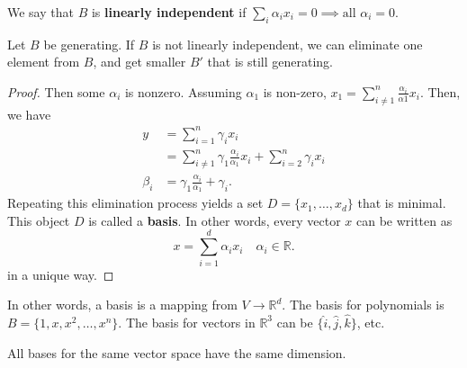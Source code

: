 \begin{definition}
	We say that \( B \) is \textbf{linearly independent} if \( \sum_{i} \alpha _i x_i = 0 \implies \text{all } \alpha _i = 0 \).
\end{definition}

\begin{prop}
	Let \( B \) be generating. If \( B \) is not linearly independent, we can eliminate one element from \( B \), and get smaller \( B' \) that is still generating.
\end{prop}
\begin{proof}
	Then some \( \alpha _i \) is nonzero. Assuming \( \alpha _1 \) is non-zero, \( x_1 = \sum_{i \neq  1}^{n} \frac{\alpha _i}{\alpha 1} x_i \). Then, we have
	\begin{align*}
		y &= \sum_{i=1}^{n} \gamma _i x_i \tag{\( B \) generating} \\
		&= \sum_{i \neq 1}^{n} \gamma _1 \frac{\alpha _i}{\alpha_1} x_i + \sum_{i=2}^{n} \gamma _i x_i\\
		\beta_i &= \gamma _1 \frac{\alpha _i}{\alpha _1} + \gamma _i
	.\end{align*}
	Repeating this elimination process yields a set \( D = \{x_{1},\ldots ,x_d\}   \) that is minimal. This object \( D \) is called a \textbf{basis}. In other words, every vector \( x \) can be written as \[
		x = \sum_{i=1}^{d} \alpha _i x_i \quad \alpha _i \in \mathbb{R}
	.\] in a unique way.
\end{proof}

In other words, a basis is a mapping from \( V \to \mathbb{R}^{d}  \). The basis for polynomials is \( B = \{1,x,x^{2},\ldots ,x^{n}  \}   \). The basis for vectors in \( \mathbb{R}^{3}  \) can be \( \{\hat{i}, \hat{j}, \hat{k}\} \), etc.

\begin{note}
	All bases for the same vector space have the same dimension.
\end{note}

